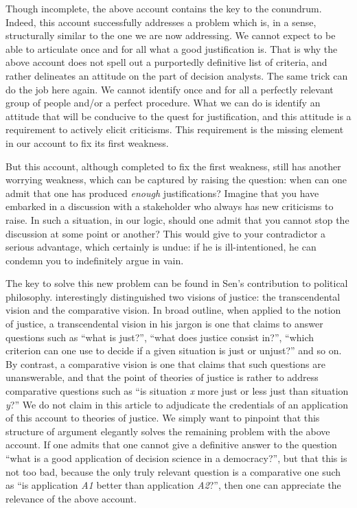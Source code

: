 \documentclass[preprint,11pt]{elsarticle}
\begin{document}
Though incomplete, the above account contains the key to the conundrum. Indeed, this account successfully addresses a problem which is, in a sense, structurally similar to the one we are now addressing. We cannot expect to be able to articulate once and for all what a good justification is. That is why the above account does not spell out a purportedly definitive list of criteria, and rather delineates an attitude on the part of decision analysts. The same trick can do the job here again. We cannot identify once and for all a perfectly relevant group of people and/or a perfect procedure. What we can do is identify an attitude that will be conducive to the quest for justification, and this attitude is a requirement to actively elicit criticisms. This requirement is the missing element in our account to fix its first weakness.

But this account, although completed to fix the first weakness, still has another worrying weakness, which can be captured by raising the question: when can one admit that one has produced \emph{enough} justifications? Imagine that you have embarked in a discussion with a stakeholder who always has new criticisms to raise. In such a situation, in our logic, should one admit that you cannot stop the discussion at some point or another? This would give to your contradictor a serious advantage, which certainly is undue: if he is ill-intentioned, he can condemn you to indefinitely argue in vain.

The key to solve this new problem can be found in Sen's contribution to political philosophy. \cite{sen_idea_2009} interestingly distinguished two visions of justice: the transcendental vision and the comparative vision. In broad outline, when applied to the notion of justice, a transcendental vision in his jargon is one that claims to answer questions such as ``what is just?'', ``what does justice consist in?'', ``which criterion can one use to decide if a given situation is just or unjust?'' and so on. By contrast, a comparative vision is one that claims that such questions are unanswerable, and that the point of theories of justice is rather to address comparative questions such as ``is situation \emph{x} more just or less just than situation \emph{y}?'' We do not claim in this article to adjudicate the credentials of an application of this account to theories of justice. We simply want to pinpoint that this structure of argument elegantly solves the remaining problem with the above account. If one admits that one cannot give a definitive answer to the question ``what is a good application of decision science in a democracy?'', but that this is not too bad, because the only truly relevant question is a comparative one such as ``is application \emph{A1} better than application \emph{A2}?'', then one can appreciate the relevance of the above account.
\end{document}
